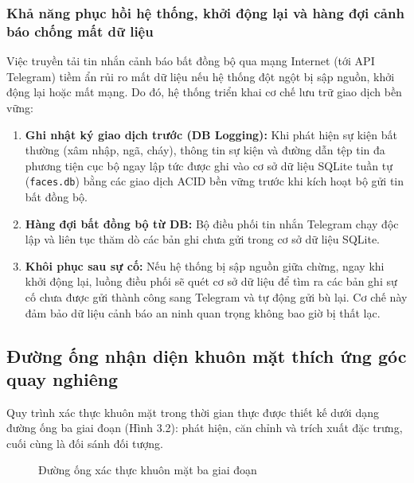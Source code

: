 \documentclass[12pt,a4paper]{article}
\begin{document}
\subsubsection{Khả năng phục hồi hệ thống, khởi động lại và hàng đợi cảnh báo chống mất dữ liệu}
Việc truyền tải tin nhắn cảnh báo bất đồng bộ qua mạng Internet (tới API Telegram) tiềm ẩn rủi ro mất dữ liệu nếu hệ thống đột ngột bị sập nguồn, khởi động lại hoặc mất mạng. Do đó, hệ thống triển khai cơ chế lưu trữ giao dịch bền vững:
\begin{enumerate}
    \item \textbf{Ghi nhật ký giao dịch trước (DB Logging):} Khi phát hiện sự kiện bất thường (xâm nhập, ngã, cháy), thông tin sự kiện và đường dẫn tệp tin đa phương tiện cục bộ ngay lập tức được ghi vào cơ sở dữ liệu SQLite tuần tự (\texttt{faces.db}) bằng các giao dịch ACID bền vững trước khi kích hoạt bộ gửi tin bất đồng bộ.
    \item \textbf{Hàng đợi bất đồng bộ từ DB:} Bộ điều phối tin nhắn Telegram chạy độc lập và liên tục thăm dò các bản ghi chưa gửi trong cơ sở dữ liệu SQLite.
    \item \textbf{Khôi phục sau sự cố:} Nếu hệ thống bị sập nguồn giữa chừng, ngay khi khởi động lại, luồng điều phối sẽ quét cơ sở dữ liệu để tìm ra các bản ghi sự cố chưa được gửi thành công sang Telegram và tự động gửi bù lại. Cơ chế này đảm bảo dữ liệu cảnh báo an ninh quan trọng không bao giờ bị thất lạc.
\end{enumerate}


\subsection{Đường ống nhận diện khuôn mặt thích ứng góc quay nghiêng}
Quy trình xác thực khuôn mặt trong thời gian thực được thiết kế dưới dạng đường ống ba giai đoạn (Hình 3.2): phát hiện, căn chỉnh và trích xuất đặc trưng, cuối cùng là đối sánh đối tượng.

\begin{figure}[h]
    \centering
    \caption{Đường ống xác thực khuôn mặt ba giai đoạn}
    \label{fig:face_pipeline}
\end{figure}
\end{document}
